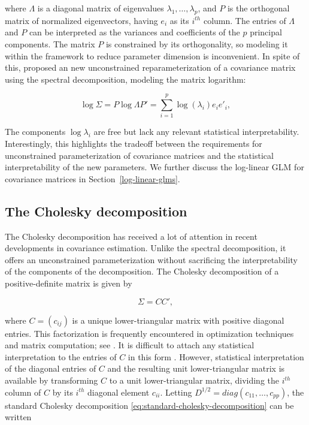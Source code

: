 \noindent
where $\Lambda$ is a diagonal matrix of eigenvalues $\lambda_1,\dots, \lambda_p$, and $P$ is the orthogonal matrix of normalized eigenvectors, having  $e_i$ as its $i^{th}$ column. The entries of $\Lambda$ and $P$ can be interpreted as the variances and coefficients of the $p$ principal components. The matrix $P$ is constrained by its orthogonality, so modeling it within the framework to reduce parameter dimension is inconvenient. In spite of this, \cite{chiu1996matrix} proposed an new unconstrained reparameterization of a covariance matrix using the spectral decomposition, modeling the matrix logarithm:

\begin{equation} \label{eq:spectral-decomposition}
\log \Sigma = P \log\Lambda P' = \sum_{i = 1}^p \log\left(\lambda_i \right)e_i e'_i,
\end{equation}

\noindent
The components $\log \lambda_i$ are free but lack any relevant statistical interpretability. Interestingly, this highlights the tradeoff between the requirements for unconstrained parameterization of covariance matrices and the statistical interpretability of the new parameters. We further discuss the log-linear GLM for covariance matrices in Section~\ref{log-linear-glms}.


\subsection{The Cholesky decomposition} \label{chapter-1-cholesky-decomposition}

The Cholesky decomposition has received a lot of attention in recent developments in covariance estimation. Unlike the spectral decomposition, it offers an unconstrained parameterization without sacrificing the interpretability of the components of the decomposition. The Cholesky decomposition of a positive-definite matrix is given by

\begin{equation}\label{eq:standard-cholesky-decomposition}
\Sigma = CC',
\end{equation}

\noindent
where $C = \left(c_{ij} \right)$ is a unique lower-triangular matrix with positive diagonal entries. This factorization is frequently encountered in optimization techniques and matrix computation; see \cite{golub2012matrix}. It is difficult to attach any statistical interpretation to the entries of $C$ in this form \cite{pinheiro1996unconstrained}. However, statistical interpretation of the diagonal entries of $C$ and the resulting unit lower-triangular matrix is available by transforming $C$ to a unit lower-triangular matrix, dividing the $i^{th}$ column of $C$ by its $i^{th}$ diagonal element $c_{ii}$. Letting $D^{1/2} = diag\left( c_{11},\dots, c_{pp} \right)$, the standard Cholesky decomposition \ref{eq:standard-cholesky-decomposition} can be written

